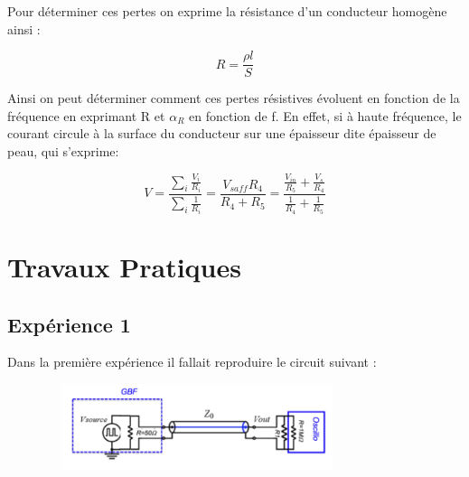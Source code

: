 \documentclass[12pt,a4paper, french]{article}
\begin{document}
    Pour déterminer ces pertes on exprime la résistance d’un conducteur homogène ainsi :
    \begin{center}
    \begin{equation*}
                R=\frac{\rho l}{S}
    \end{equation*}
    \end{center}
        
    Ainsi on peut déterminer comment ces pertes résistives évoluent en fonction de la fréquence en exprimant R et $\alpha_R$ en fonction de f. En effet, si à haute fréquence,
     le courant circule à la surface du conducteur sur une épaisseur dite épaisseur de peau, qui s'exprime:
     \begin{center}
    \begin{equation*}
        V=\frac{\sum_{i}\frac{V_i}{R_i}}{\sum_{i}\frac{1}{R_i}}=\frac{V_{saff} R_4}{R_4 + R_5}=\frac{\frac{V_{in}}{R_5}+\frac{V_s}{R_4}}{\frac{1}{R_4}+\frac{1}{R_5}}
    \end{equation*}
    \end{center}
    
    \section{Travaux Pratiques}
    \subsection{Expérience 1}
    
    Dans la première expérience il fallait reproduire le circuit suivant :
    \begin{figure}[!h]
        \begin{center}
            \includegraphics[width=9cm,height=2.5cm]{schemaexp1.png}
        \end{center}
        \end{figure}
    
\end{document}
